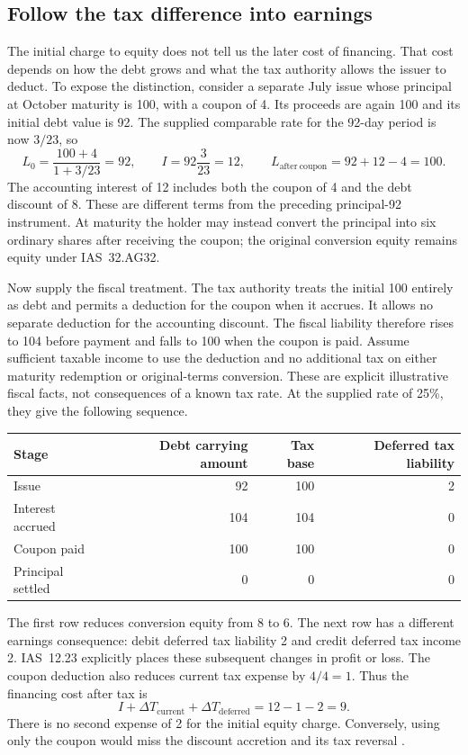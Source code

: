 \subsection{Follow the tax difference into earnings}
\label{sec:compound-tax-rollforward}

The initial charge to equity does not tell us the later cost of financing.
That cost depends on how the debt grows and what the tax authority allows the
issuer to deduct. To expose the distinction, consider a separate July issue
whose principal at October maturity is 100, with a coupon of 4. Its proceeds
are again 100 and its initial debt value is 92. The supplied comparable rate
for the 92-day period is now $3/23$, so
\[
 L_0=\frac{100+4}{1+3/23}=92,\qquad
 I=92\frac{3}{23}=12,\qquad L_{\mathrm{after\ coupon}}=92+12-4=100.
\]
The accounting interest of 12 includes both the coupon of 4 and the debt
discount of 8. These are different terms from the preceding principal-92
instrument. At maturity the holder may instead convert the principal into
six ordinary shares after receiving the coupon; the original conversion
equity remains equity under IAS~32.AG32.

Now supply the fiscal treatment. The tax authority treats the initial 100
entirely as debt and permits a deduction for the coupon when it accrues.
It allows no separate deduction for the accounting discount. The fiscal
liability therefore rises to 104 before payment and falls to 100 when the
coupon is paid. Assume sufficient taxable income to use the deduction and
no additional tax on either maturity redemption or original-terms conversion.
These are explicit illustrative fiscal facts, not consequences of a known
tax rate. At the supplied rate of 25\%, they give the following sequence.

\begin{center}
\begin{tabular}{lrrr}
\toprule
Stage & Debt carrying amount & Tax base & Deferred tax liability\\
\midrule
Issue & 92 & 100 & 2\\
Interest accrued & 104 & 104 & 0\\
Coupon paid & 100 & 100 & 0\\
Principal settled & 0 & 0 & 0\\
\bottomrule
\end{tabular}
\end{center}

The first row reduces conversion equity from 8 to 6. The next row has a
different earnings consequence: debit deferred tax liability 2 and credit
deferred tax income 2. IAS~12.23 explicitly places these subsequent changes
in profit or loss. The coupon deduction also reduces current tax expense
by $4/4=1$. Thus the financing cost after tax is
\[
 I+\Delta T_{\mathrm{current}}+\Delta T_{\mathrm{deferred}}
 =12-1-2=9.
\]
There is no second expense of 2 for the initial equity charge. Conversely,
using only the coupon would miss the discount accretion and its tax reversal
\citep[IAS~12, paragraphs 23, 58 and 61A; IAS~33, paragraphs 33--34]{eu20231803}.

